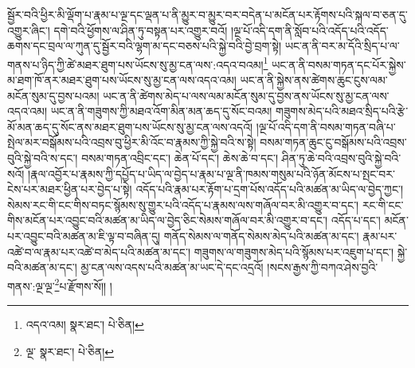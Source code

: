 སྦྱོར་བའི་ཕྱིར་མི་ལྡོག་པ་རྣམ་པ་ལྔ་དང་ལྡན་པ་ནི་མྱུར་བ་མྱུར་བར་བདེན་པ་མངོན་པར་རྟོགས་པའི་སྐལ་བ་ཅན་དུ་འགྱུར་ཞིང་། དགེ་བའི་ཕྱོགས་ལ་ཤིན་ཏུ་བསྟན་པར་འགྱུར་བའོ། །ལྔ་པོ་འདི་དག་ནི་སློབ་པའི་འདོད་པའི་འདོད་ཆགས་དང་བྲལ་ལ་ཀུན་དུ་སྦྱོར་བའི་ལྷག་མ་དང་བཅས་པའི་སྐྱེ་བའི་བྱེ་བྲག་སྟེ། ཡང་ན་ནི་བར་མ་དོའི་སྲིད་པ་ལ་གནས་པ་ཉིད་ཀྱི་ཚེ་མཐར་ཐུག་པས་ཡོངས་སུ་མྱ་ངན་ལས་:འདའ་བའམ།\footnote{འདའ་འམ།  སྣར་ཐང་།  པེ་ཅིན། } ཡང་ན་ནི་བསམ་གཏན་དང་པོར་སྐྱེས་མ་ཐག་ཁོ་ནར་མཐར་ཐུག་པས་ཡོངས་སུ་མྱ་ངན་ལས་འདའ་འམ། ཡང་ན་ནི་སྐྱེས་ནས་ཚེགས་ཆུང་ངུས་ལམ་མངོན་སུམ་དུ་བྱས་པའམ། ཡང་ན་ནི་ཚེགས་མེད་པ་ལས་ལམ་མངོན་སུམ་དུ་བྱས་ནས་ཡོངས་སུ་མྱ་ངན་ལས་འདའ་འམ། ཡང་ན་ནི་གཟུགས་ཀྱི་མཐའ་འོག་མིན་མན་ཆད་དུ་སོང་བའམ། གཟུགས་མེད་པའི་མཐའ་སྲིད་པའི་རྩེ་མོ་མན་ཆད་དུ་སོང་ནས་མཐར་ཐུག་པས་ཡོངས་སུ་མྱ་ངན་ལས་འདའོ། །ལྔ་པོ་འདི་དག་ནི་བསམ་གཏན་བཞི་པ་སྤེལ་མར་བསྒོམས་པའི་འབྲས་བུ་ཕྱིར་མི་འོང་བ་རྣམས་ཀྱི་སྐྱེ་བའི་ས་སྟེ། བསམ་གཏན་ཆུང་ངུ་བསྒོམས་པའི་འབྲས་བུའི་སྐྱེ་བའི་ས་དང་། བསམ་གཏན་འབྲིང་དང་། ཆེན་པོ་དང་། ཆེས་ཆེ་བ་དང་། ཤིན་ཏུ་ཆེ་བའི་འབྲས་བུའི་སྐྱེ་བའི་སའོ། །རྣལ་འབྱོར་པ་རྣམས་ཀྱི་དཔྱོད་པ་ཡིད་ལ་བྱེད་པ་རྣམ་པ་ལྔ་ནི་ཁམས་གསུམ་པའི་ཉོན་མོངས་པ་སྤང་བར་ངེས་པར་མཐར་ཕྱིན་པར་བྱེད་པ་སྟེ། འདོད་པའི་རྣམ་པར་རྟོག་པ་དྲག་པོས་འདོད་པའི་མཚན་མ་ཡིད་ལ་བྱེད་ཀྱང་། སེམས་རང་གི་ངང་གིས་བཏང་སྙོམས་སུ་གྱུར་པའི་འདོད་པ་རྣམས་ལས་གཞོལ་བར་མི་འགྱུར་བ་དང་། རང་གི་ངང་གིས་མངོན་པར་འབྱུང་བའི་མཚན་མ་ཡིད་ལ་བྱེད་ཅིང་སེམས་གཞོལ་བར་མི་འགྱུར་བ་དང་། འདོད་པ་དང་། མངོན་པར་འབྱུང་བའི་མཚན་མ་ཇི་ལྟ་བ་བཞིན་དུ། གནོད་སེམས་ལ་གནོད་སེམས་མེད་པའི་མཚན་མ་དང་། རྣམ་པར་འཚེ་བ་ལ་རྣམ་པར་འཚེ་བ་མེད་པའི་མཚན་མ་དང་། གཟུགས་ལ་གཟུགས་མེད་པའི་སྙོམས་པར་འཇུག་པ་དང་། སྐྱེ་བའི་མཚན་མ་དང་། མྱ་ངན་ལས་འདས་པའི་མཚན་མ་ཡང་དེ་དང་འདྲའོ། །སངས་རྒྱས་ཀྱི་བཀའ་ཤེས་བྱའི་གནས་:ལྔ་ལྔ་\footnote{ལྔ་  སྣར་ཐང་།  པེ་ཅིན། }པ་རྫོགས་སོ།། །

